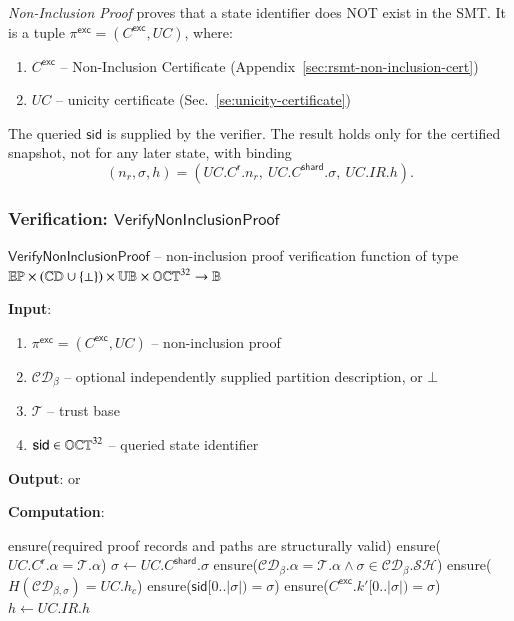 \emph{Non-Inclusion Proof} proves that a state identifier does NOT exist in the SMT. It is a tuple $\pi^\mathsf{exc} = (C^\mathsf{exc}, UC)$, where:
\begin{enumerate}
	\item $C^\mathsf{exc}$ -- Non-Inclusion Certificate (Appendix~\ref{sec:rsmt-non-inclusion-cert})
	\item $UC$ -- unicity certificate (Sec.~\ref{se:unicity-certificate})
\end{enumerate}

The queried $\mathsf{sid}$ is supplied by the verifier. The result holds only for the certified snapshot, not for any later state, with binding
\[
(n_r,\sigma,h)=(UC.C^\mathsf{r}.n_r,\ UC.C^\mathsf{shard}.\sigma,\ UC.IR.h).
\]

\subsubsection{Verification: $\mathsf{VerifyNonInclusionProof}$}\label{VerifyNonInclusionProof}

$\mathsf{VerifyNonInclusionProof}$ -- non-inclusion proof verification function of type $\mathbb{EP} \times (\mathbb{CD}\cup\{\bot\}) \times \mathbb{UB} \times \mathbb{OCT}^{32} \to \mathbb{B}$

\textbf{Input}:
\begin{enumerate}
	\item $\pi^\mathsf{exc} = (C^\mathsf{exc}, UC)$ -- non-inclusion proof
	\item $\mathcal{CD}_\beta$ -- optional independently supplied partition description, or $\bot$
	\item $\mathcal{T}$ -- trust base
	\item $\mathsf{sid} \in \mathbb{OCT}^{32}$ -- queried state identifier
\end{enumerate}

\textbf{Output}: \TRUE or \FALSE

\textbf{Computation}:
\begin{algorithmic}[0]
	\State ensure(required proof records and paths are structurally valid)
	\State ensure($UC.C^\mathsf{r}.\alpha = \mathcal{T}.\alpha$) 
	\State $\sigma \gets UC.C^\mathsf{shard}.\sigma$
		\State ensure($\mathcal{CD}_\beta.\alpha = \mathcal{T}.\alpha\land\sigma\in\mathcal{CD}_\beta.\mathcal{SH}$)
		\State ensure($H(\mathcal{CD}_{\beta,\sigma})=UC.h_c$)
	\EndIf
	\State ensure($\mathsf{sid}[0..|\sigma|)=\sigma$) 
		\State ensure($C^\mathsf{exc}.k'[0..|\sigma|)=\sigma$) 
	\EndIf
	\State $h \gets UC.IR.h$ 
	 \Return \FALSE \EndIf
	 \Return \FALSE \EndIf
	\State \Return \TRUE
\end{algorithmic}

